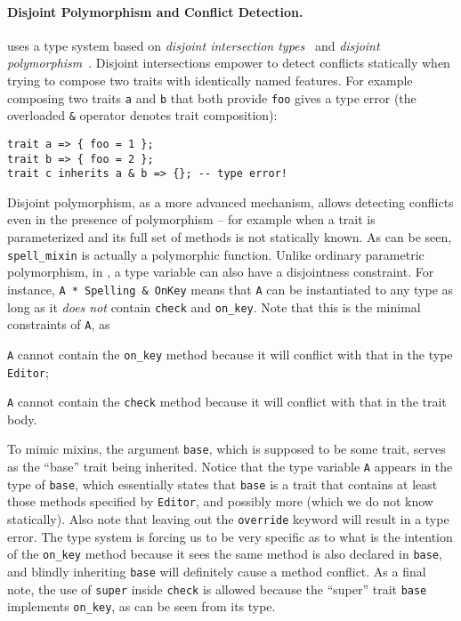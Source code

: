 \paragraph{Disjoint Polymorphism and Conflict Detection.}

\sedel uses a type system based on \emph{disjoint intersection types}~\cite{oliveira2016disjoint} and
\emph{disjoint polymorphism}~\cite{alpuimdisjoint}. Disjoint intersections
empower \sedel to detect conflicts statically when trying to compose two
traits with identically named features. For example composing two traits
\lstinline{a} and \lstinline{b} that both provide \lstinline{foo} gives a
type error (the overloaded \lstinline{&} operator denotes trait composition):
\begin{lstlisting}
trait a => { foo = 1 };
trait b => { foo = 2 };
trait c inherits a & b => {}; -- type error!
\end{lstlisting}
Disjoint polymorphism, as a more advanced mechanism, allows detecting conflicts
even in the presence of polymorphism -- for example when a trait is parameterized and its
full set of methods is not statically known. As can be seen,
\lstinline{spell_mixin} is actually a polymorphic function. Unlike ordinary
parametric polymorphism, in \sedel, a type variable can also have a disjointness
constraint. For instance, \lstinline{A * Spelling & OnKey}
means that \lstinline{A} can be instantiated to any type as long as it \emph{does not}
contain \lstinline{check} and \lstinline{on_key}. Note that this is the minimal constraints of \lstinline{A},
as
\begin{inparaenum}[(1)]
  \item \lstinline{A} cannot contain the \lstinline{on_key} method because it will conflict with that in the type \lstinline{Editor};
  \item \lstinline{A} cannot contain the \lstinline{check} method because it will conflict with that in the trait body.
\end{inparaenum}
To mimic mixins, the
argument \lstinline{base}, which is supposed to be some trait, serves as the
``base'' trait being inherited. Notice that the type variable
\lstinline{A} appears in the type of \lstinline{base}, which essentially states
that \lstinline{base} is a trait that contains at least those methods specified
by \lstinline{Editor}, and possibly more (which we do not know statically).
Also note that leaving out the \lstinline{override} keyword will result in a
type error. The type system is forcing us to be very specific as to what is the
intention of the \lstinline{on_key} method because it sees the same method is
also declared in \lstinline{base}, and blindly inheriting \lstinline{base}
will definitely cause a method conflict. As a final note, the use of \lstinline{super}
inside \lstinline{check} is allowed because the ``super'' trait \lstinline{base}
implements \lstinline{on_key}, as can be seen from its type.


